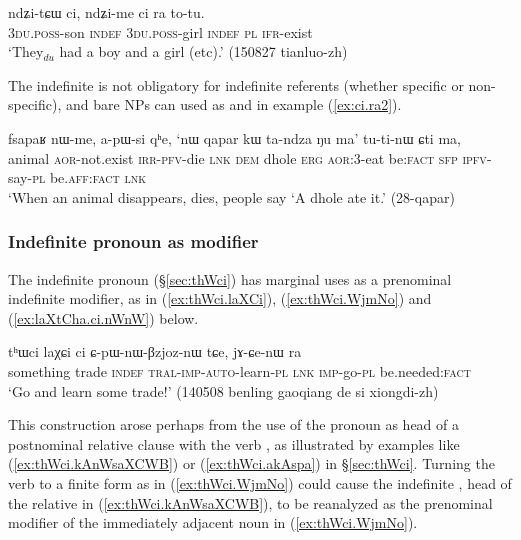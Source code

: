 \begin{exe}
\ex \label{ex:ci.ra}
 \gll  ndʑi-tɕɯ ci, ndʑi-me ci ra to-tu. \\
 \textsc{3du}.\textsc{poss}-son \textsc{indef}  \textsc{3du}.\textsc{poss}-girl \textsc{indef} \textsc{pl} \textsc{ifr}-exist \\
 \glt  `They$_{du}$ had a boy and a girl (etc).' (150827 tianluo-zh)
\end{exe}

 The indefinite  is not obligatory for indefinite referents (whether specific or non-specific), and bare NPs can used as  and  in example (\ref{ex:ci.ra2}).
 

\begin{exe}
\ex \label{ex:ci.ra2}
 \gll  fsapaʁ nɯ-me, a-pɯ-si qʰe, `nɯ qapar kɯ ta-ndza ŋu ma' tu-ti-nɯ ɕti ma, \\
 animal \textsc{aor}-not.exist \textsc{irr}-\textsc{pfv}-die \textsc{lnk} \textsc{dem} dhole \textsc{erg} \textsc{aor}:3\flobv{}-eat be:\textsc{fact} \textsc{sfp} \textsc{ipfv}-say-\textsc{pl} be.\textsc{aff}:\textsc{fact} \textsc{lnk}  \\
 \glt `When an animal disappears, dies, people say `A dhole ate it.' (28-qapar)
\end{exe}


\subsubsection{Indefinite pronoun as modifier} \label{sec:indefinite}
The indefinite pronoun  (§\ref{sec:thWci}) has marginal uses as a prenominal indefinite modifier, as in  (\ref{ex:thWci.laXCi}), (\ref{ex:thWci.WjmNo}) and (\ref{ex:laXtCha.ci.nWnW}) below. 

\begin{exe}
\ex \label{ex:thWci.laXCi}
\gll   tʰɯci laχɕi ci ɕ-pɯ-nɯ-βzjoz-nɯ tɕe, jɤ-ɕe-nɯ ra \\
something trade \textsc{indef} \textsc{tral}-\textsc{imp}-\textsc{auto}-learn-\textsc{pl} \textsc{lnk} \textsc{imp}-go-\textsc{pl} be.needed:\textsc{fact} \\
\glt `Go and learn some trade!' (140508 benling gaoqiang de si xiongdi-zh)
 \end{exe}
 
 This construction arose perhaps from the use of the pronoun  as head of a postnominal relative clause with the verb , as illustrated by examples like (\ref{ex:thWci.kAnWsaXCWB}) or (\ref{ex:thWci.akAspa}) in §\ref{sec:thWci}. Turning the verb  to a finite form as in (\ref{ex:thWci.WjmNo}) could cause the indefinite , head of the relative in (\ref{ex:thWci.kAnWsaXCWB}), to be reanalyzed as the prenominal modifier of the immediately adjacent noun in (\ref{ex:thWci.WjmNo}).

